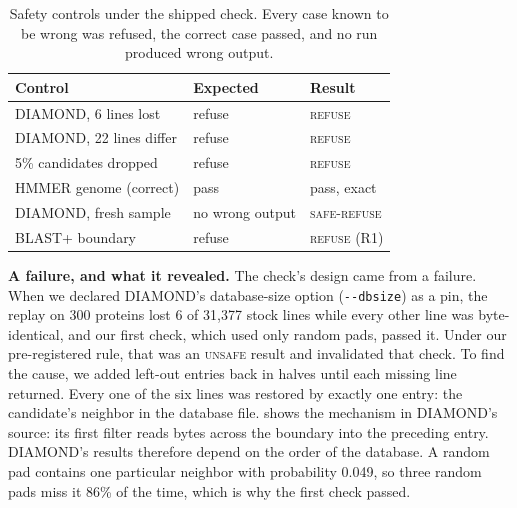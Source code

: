 \documentclass[letterpaper,twocolumn,10pt]{article}
\theoremstyle{definition}
\newcommand{\dec}[1]{\textsc{#1}}
\begin{document}
\begin{table}[t]
\caption{Safety controls under the shipped check. Every case known to be wrong was refused, the correct case passed,
and no run produced wrong output.}
\label{tab:safety}
\centering\small
\setlength{\tabcolsep}{3pt}
\begin{tabular}{@{}lll@{}}
\toprule
Control & Expected & Result \\
\midrule
DIAMOND, 6 lines lost & refuse & \dec{refuse} \\
DIAMOND, 22 lines differ & refuse & \dec{refuse} \\
5\% candidates dropped & refuse & \dec{refuse} \\
HMMER genome (correct) & pass   & pass, exact \\
DIAMOND, fresh sample & no wrong output & \dec{safe-refuse} \\
BLAST+ boundary & refuse & \dec{refuse} (R1) \\
\bottomrule
\end{tabular}
\end{table}

\textbf{A failure, and what it revealed.} The check's design came from a failure. When we declared DIAMOND's database\nobreakdash-size
option (\texttt{-{}-dbsize}) as a pin, the replay on 300 proteins lost 6 of 31{,}377 stock lines while every other line
was byte\nobreakdash-identical, and our first check, which used only random pads, passed it. Under our pre\nobreakdash-registered rule, that was
an \dec{unsafe} result and invalidated that check. To find the cause, we added left\nobreakdash-out entries back in halves until each
missing line returned. Every one of the six lines was restored by exactly one entry: the candidate's neighbor in the
database file.  shows the mechanism in DIAMOND's source: its first filter reads bytes across the
boundary into the preceding entry. DIAMOND's results therefore depend on the order of the database. A random pad contains one particular neighbor with probability 0.049, so three random pads miss it
86\% of the time, which is why the first check passed.
\end{document}

